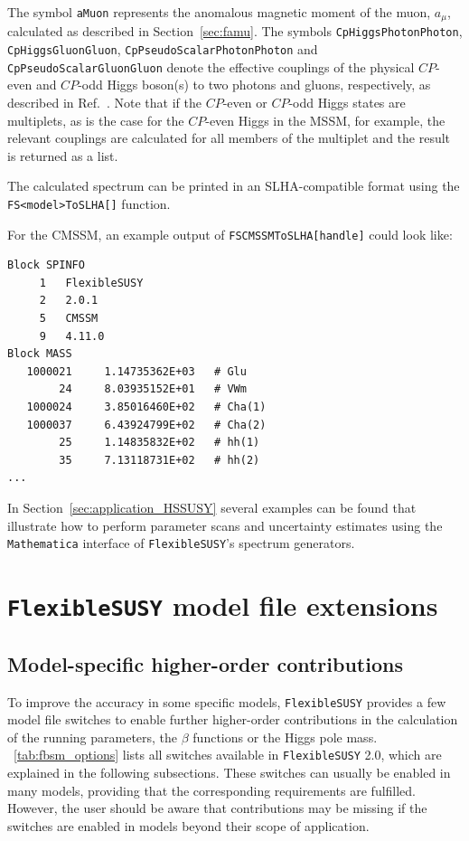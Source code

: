 \documentclass[final,3p,11pt,pdflatex]{elsarticle}
\makeatletter
\newcommand{\fs}{\texttt{FlexibleSUSY}\@\xspace}
\newcommand{\fstwo}{\fs 2.0\@\xspace}
\newcommand{\mathematica}{\texttt{Ma\-the\-ma\-ti\-ca}\xspace}
\newcommand{\code}[1]{\lstinline|#1|}  %
\newcommand{\amu}{\ensuremath{a_\mu}\xspace}
\newcommand{\secref}[1]{Section~\ref{#1}}
\newcommand{\tabref}[1]{\tablename~\ref{#1}}
\newcommand{\CP}{\ensuremath{CP}\xspace}
\makeatother
\begin{document}
%
The symbol \code{aMuon} represents the anomalous magnetic moment of
the muon, $\amu$, calculated as described in \secref{sec:famu}.  The
symbols \code{CpHiggsPhotonPhoton}, \code{CpHiggsGluonGluon},
\code{CpPseudoScalarPhotonPhoton} and \code{CpPseudoScalarGluonGluon}
denote the effective couplings of the physical \CP-even and \CP-odd Higgs
boson(s) to two photons and gluons, respectively, as described in
Ref.~\cite{Staub:2016dxq}.  Note that if the \CP-even or \CP-odd Higgs states
are multiplets, as is the case for the \CP-even Higgs in the MSSM, for
example, the relevant couplings are calculated for all members of the
multiplet and the result is returned as a list.

The calculated spectrum can be printed in an SLHA-compatible format
using the \code{FS<model>ToSLHA[]} function.
%
\begin{example}
  For the CMSSM, an example output of \code{FSCMSSMToSLHA[handle]}
  could look like:
\begin{lstlisting}
Block SPINFO
     1   FlexibleSUSY
     2   2.0.1
     5   CMSSM
     9   4.11.0
Block MASS
   1000021     1.14735362E+03   # Glu
        24     8.03935152E+01   # VWm
   1000024     3.85016460E+02   # Cha(1)
   1000037     6.43924799E+02   # Cha(2)
        25     1.14835832E+02   # hh(1)
        35     7.13118731E+02   # hh(2)
...
\end{lstlisting}
\end{example}
%
In \secref{sec:application_HSSUSY} several examples can be found that
illustrate how to perform parameter scans and uncertainty
estimates using the \mathematica interface of \fs's spectrum
generators.

\section{\fs model file extensions}
\label{sec:model_file_extensions}

\subsection{Model-specific higher-order contributions}
\label{sec:model_specific_contributions}
To improve the accuracy in some specific models, \fs provides a few
model file switches to enable further higher-order contributions in
the calculation of the running parameters, the $\beta$ functions or
the Higgs pole mass.  \tabref{tab:fbsm_options} lists all switches
available in \fstwo, which are explained in the following subsections.
%
These switches can usually be enabled in many models, providing that
the corresponding requirements are fulfilled.  However, the user
should be aware that contributions may be missing if the switches are
enabled in models beyond their scope of application.
\end{document}
